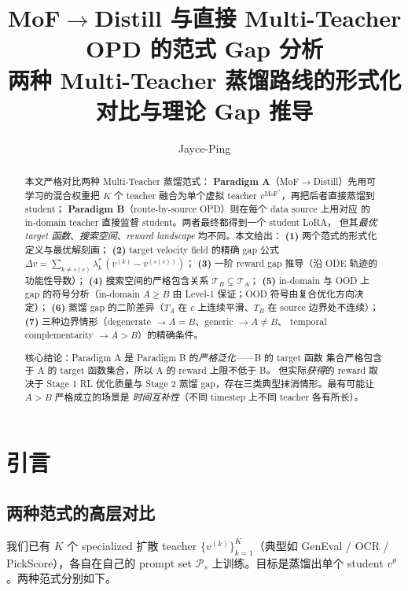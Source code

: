 \documentclass[11pt,a4paper]{article}
\title{\textbf{MoF$\to$Distill 与直接 Multi-Teacher OPD 的范式 Gap 分析}\\[0.3em]
\large 两种 Multi-Teacher 蒸馏路线的形式化对比与理论 Gap 推导}
\author{Jayce-Ping}
\date{}
\newcommand{\MoF}{\mathrm{MoF}}
\theoremstyle{definition}
\begin{document}
\maketitle

\begin{abstract}
本文严格对比两种 Multi-Teacher 蒸馏范式：
\textbf{Paradigm A}（MoF$\to$Distill）先用可学习的混合权重把 $K$ 个 teacher
融合为单个虚拟 teacher $v^{\MoF^*}$，再把后者直接蒸馏到 student；
\textbf{Paradigm B}（route-by-source OPD）则在每个 data source 上用对应
的 in-domain teacher 直接监督 student。两者最终都得到一个 student LoRA，
但其\emph{最优 target 函数}、\emph{搜索空间}、\emph{reward landscape}
均不同。本文给出：
\textbf{(1)} 两个范式的形式化定义与最优解刻画；
\textbf{(2)} target velocity field 的精确 gap 公式
$\Delta v = \sum_{k \neq s(c)} \lambda_k^*\,(v^{(k)} - v^{(s(c))})$；
\textbf{(3)} 一阶 reward gap 推导（沿 ODE 轨迹的功能性导数）；
\textbf{(4)} 搜索空间的严格包含关系 $\mathcal{T}_B \subsetneq \mathcal{T}_A$；
\textbf{(5)} in-domain 与 OOD 上 gap 的符号分析（in-domain
$A \geq B$ 由 Level-1 保证；OOD 符号由复合优化方向决定）；
\textbf{(6)} 蒸馏 gap 的二阶差异（$T_A$ 在 $c$ 上连续平滑、$T_B$ 在
source 边界处不连续）；
\textbf{(7)} 三种边界情形（degenerate $\to A = B$、generic $\to A \neq B$、
temporal complementarity $\to A > B$）的精确条件。

核心结论：Paradigm A 是 Paradigm B 的\emph{严格泛化}——B 的 target 函数
集合严格包含于 A 的 target 函数集合，所以 A 的 reward 上限不低于 B。
但实际\emph{获得}的 reward 取决于 Stage 1 RL 优化质量与 Stage 2 蒸馏
gap，存在三类典型抹消情形。最有可能让 $A > B$ 严格成立的场景是
\emph{时间互补性}（不同 timestep 上不同 teacher 各有所长）。
\end{abstract}

\tableofcontents
\newpage

\section{引言}
\label{sec:intro}

\subsection{两种范式的高层对比}

我们已有 $K$ 个 specialized 扩散 teacher $\{v^{(k)}\}_{k=1}^K$（典型如
GenEval / OCR / PickScore），各自在自己的 prompt set $\mathcal{P}_s$
上训练。目标是蒸馏出单个 student $v^\theta$。两种范式分别如下。
\end{document}
